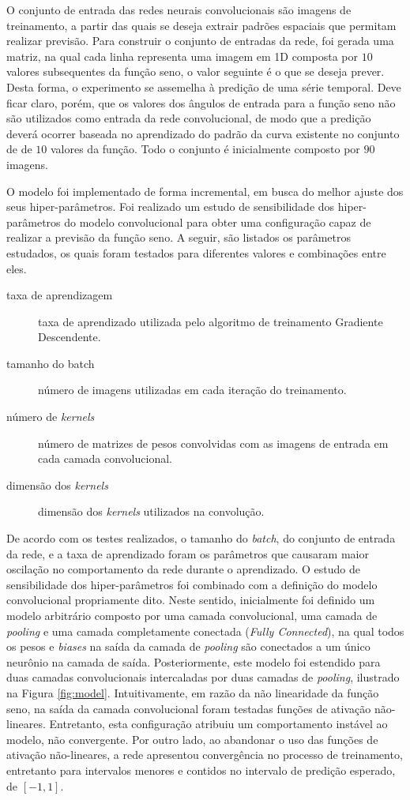 \documentclass[11pt]{article}
\begin{document}
O conjunto de entrada das redes neurais convolucionais
são imagens de treinamento, a partir das quais se deseja extrair padrões espaciais
que permitam realizar previsão. Para construir o conjunto de entradas da rede,
foi gerada uma matriz, na qual cada linha representa uma imagem em 1D
composta por $10$ valores subsequentes da função seno, o valor seguinte é o que se
deseja prever. Desta forma, o experimento se assemelha à predição de uma série temporal.
Deve ficar claro, porém, que os valores dos ângulos de entrada para a função
seno não são utilizados como entrada da rede convolucional, de modo que a predição
deverá ocorrer baseada no aprendizado do padrão da curva existente no conjunto de
de $10$ valores da função. Todo o conjunto é inicialmente composto por $90$ imagens.

O modelo foi implementado de forma incremental, em busca do melhor ajuste dos
seus hiper-parâmetros. Foi realizado um estudo de sensibilidade dos hiper-parâmetros do
modelo convolucional para obter uma configuração capaz de realizar
a previsão da função seno. A seguir, são listados os parâmetros estudados,
os quais foram testados para diferentes valores e combinações entre eles.
 \begin{description}
   \item[taxa de aprendizagem] taxa de aprendizado utilizada pelo algoritmo de treinamento Gradiente Descendente.
   \item[tamanho do batch] número de imagens utilizadas em cada iteração do treinamento.
   \item[número de \textit{kernels}] número de matrizes de pesos convolvidas com as imagens de entrada em cada camada convolucional.
   \item[dimensão dos \textit{kernels}] dimensão dos \textit{kernels} utilizados na convolução.
 \end{description}

De acordo com os testes realizados, o tamanho do \textit{batch},
do conjunto de entrada da rede, e a taxa de aprendizado foram
os parâmetros que causaram maior oscilação no comportamento da
rede durante o aprendizado. O estudo de sensibilidade dos hiper-parâmetros
foi combinado com a definição do modelo convolucional propriamente dito.
Neste sentido, inicialmente foi definido um modelo arbitrário composto por uma camada convolucional,
uma camada de \textit{pooling} e uma camada completamente conectada (\textit{Fully Connected}),
na qual todos os pesos e \textit{biases} na saída da camada de \textit{pooling} são conectados a um único
neurônio na camada de saída. Posteriormente, este modelo foi estendido para duas camadas
convolucionais intercaladas por duas camadas de \textit{pooling}, ilustrado na Figura \ref{fig:model}. Intuitivamente,
em razão da não linearidade da função seno, na saída da camada
convolucional foram testadas funções de ativação não-lineares.
Entretanto, esta configuração atribuiu um comportamento instável ao modelo, não convergente.
Por outro lado, ao abandonar o uso das funções de ativação não-lineares, a rede apresentou convergência no processo de treinamento,
entretanto para intervalos menores e contidos no intervalo de predição esperado, de $[-1,1]$.
\end{document}
